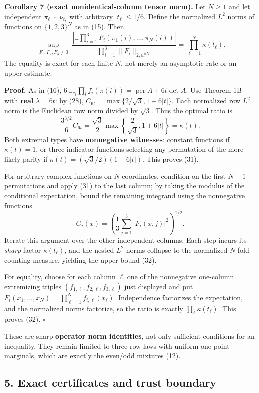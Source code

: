 \documentclass[
  11pt,
]{article}
\begin{document}
\textbf{Corollary 7 (exact nonidentical-column tensor norm).} Let
\(N\ge1\) and let independent \(\pi_\ell\sim\nu_{t_\ell}\) with
arbitrary \(|t_\ell|\le1/6\). Define the normalized \(L^2\) norms of
functions on \(\{1,2,3\}^N\) as in (15). Then \[
\boxed{
\sup_{\substack{F_1,F_2,F_3\ne0}}
\frac{
\left|\mathbb E\prod_{i=1}^3
F_i(\pi_1(i),\ldots,\pi_N(i))\right|}
{\prod_{i=1}^3\|F_i\|_{2,u_3^{\otimes N}}}
=\prod_{\ell=1}^{N}\kappa(t_\ell).
}
\tag{32}
\] The equality is exact for each finite \(N\), not merely an asymptotic
rate or an upper estimate.

\textbf{Proof.} As in (16), \(6\,\mathbb E_{\nu_t}\prod_i f_i(\pi(i))
=\operatorname{per}A+6t\det A\). Use Theorem 1B with \textbf{real}
\(\lambda=6t\): by (28), \(C_{6t}=\max\{2/\sqrt3,1+6|t|\}\). Each
normalized row \(L^2\) norm is the Euclidean row norm divided by
\(\sqrt3\). Thus the optimal ratio is \[
\frac{3^{3/2}}6C_{6t}
=\frac{\sqrt3}{2}\max\left\{\frac2{\sqrt3},
                                    1+6|t|\right\}
=\kappa(t).
\] Both extremal types have \textbf{nonnegative witnesses}: constant
functions if \(\kappa(t)=1\), or three indicator functions selecting any
permutation of the more likely parity if
\(\kappa(t)=(\sqrt3/2)(1+6|t|)\). This proves (31).

For arbitrary complex functions on \(N\) coordinates, condition on the
first \(N-1\) permutations and apply (31) to the last column; by taking
the modulus of the conditional expectation, bound the remaining
integrand using the nonnegative functions \[
G_i(x)=\left(\frac13\sum_{j=1}^{3}|F_i(x,j)|^2\right)^{1/2}.
\] Iterate this argument over the other independent columns. Each step
incurs its \emph{sharp} factor \(\kappa(t_\ell)\), and the nested
\(L^2\) norms collapse to the normalized \(N\)-fold counting measure,
yielding the upper bound (32).

For equality, choose for each column \(\ell\) one of the nonnegative
one-column extremizing triples \((f_{1,\ell},f_{2,\ell},f_{3,\ell})\)
just displayed and put
\(F_i(x_1,\ldots,x_N)=\prod_{\ell=1}^N f_{i,\ell}(x_\ell)\).
Independence factorizes the expectation, and the normalized norms
factorize, so the ratio is exactly \(\prod_\ell\kappa(t_\ell)\). This
proves (32). \(\square\)

These are sharp \textbf{operator norm identities}, not only sufficient
conditions for an inequality. They remain limited to three-row laws with
uniform one-point marginals, which are exactly the even/odd mixtures
(12).

\subsection{5. Exact certificates and trust
boundary}\label{exact-certificates-and-trust-boundary}
\end{document}
